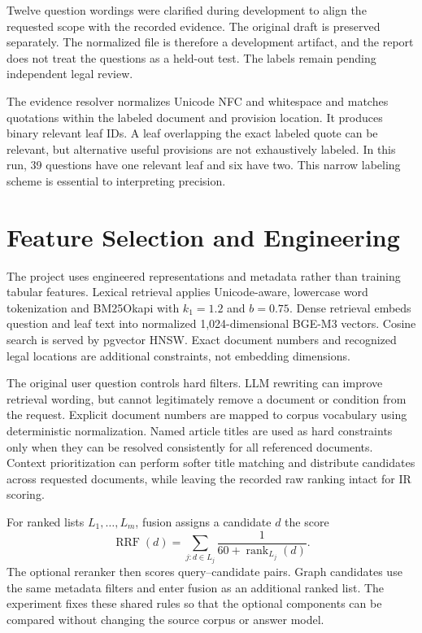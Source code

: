 Twelve question wordings were clarified during development to align the requested scope with the recorded evidence. The original draft is preserved separately. The normalized file is therefore a development artifact, and the report does not treat the questions as a held-out test. The labels remain pending independent legal review.

The evidence resolver normalizes Unicode NFC and whitespace and matches quotations within the labeled document and provision location. It produces binary relevant leaf IDs. A leaf overlapping the exact labeled quote can be relevant, but alternative useful provisions are not exhaustively labeled. In this run, 39 questions have one relevant leaf and six have two. This narrow labeling scheme is essential to interpreting precision.

\section{Feature Selection and Engineering}
The project uses engineered representations and metadata rather than training tabular features. Lexical retrieval applies Unicode-aware, lowercase word tokenization and BM25Okapi with $k_1=1.2$ and $b=0.75$. Dense retrieval embeds question and leaf text into normalized 1,024-dimensional BGE-M3 vectors. Cosine search is served by pgvector HNSW. Exact document numbers and recognized legal locations are additional constraints, not embedding dimensions.

The original user question controls hard filters. LLM rewriting can improve retrieval wording, but cannot legitimately remove a document or condition from the request. Explicit document numbers are mapped to corpus vocabulary using deterministic normalization. Named article titles are used as hard constraints only when they can be resolved consistently for all referenced documents. Context prioritization can perform softer title matching and distribute candidates across requested documents, while leaving the recorded raw ranking intact for IR scoring.

For ranked lists $L_1,\ldots,L_m$, fusion assigns a candidate $d$ the score
\begin{equation}
\operatorname{RRF}(d)=\sum_{j:d\in L_j}\frac{1}{60+\operatorname{rank}_{L_j}(d)}.
\end{equation}
The optional reranker then scores query--candidate pairs. Graph candidates use the same metadata filters and enter fusion as an additional ranked list. The experiment fixes these shared rules so that the optional components can be compared without changing the source corpus or answer model.

